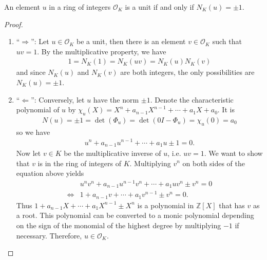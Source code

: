 \begin{thmbox}
    \begin{corollary}
        An element \(u\) in a ring of integers \(\mathcal{O}_K\) is a unit if and only if \(N_K(u) = \pm 1\).
    \end{corollary}
\end{thmbox}
\begin{proof}
    \begin{enumerate}
        \item ``\(\Rightarrow\)'': Let \(u \in \mathcal{O}_K\) be a unit, then there is an element \(v \in \mathcal{O}_K\) such that \(uv = 1\). By the multiplicative property, we have
        \begin{align*}
            1 = N_K(1) = N_K(uv) = N_K(u)N_K(v)
        \end{align*}
        and since \(N_K(u)\) and \(N_K(v)\) are both integers, the only possibilities are \(N_K(u) = \pm 1\).
        \item ``\(\Leftarrow\)'': Conversely, let \(u\) have the norm \(\pm 1\). Denote the characteristic polynomial of \(u\) by \(\chi_u (X) = X^n + a_{n-1} X^{n-1} + \cdots + a_1 X + a_0\). It is
        \begin{align*}
            N(u) = \pm 1 = \det (\Phi_u) = \det(0 I - \Phi_u) = \chi_u (0) = a_0
        \end{align*}
        so we have
        \begin{align*}
            u^n + a_{n-1} u^{n-1} + \cdots + a_1 u \pm 1 = 0 \text{.}
        \end{align*}
        Now let \(v \in K\) be the multiplicative inverse of \(u\), i.e. \(uv = 1\). We want to show that \(v\) is in the ring of integers of \(K\). Multiplying \(v^n\) on both sides of the equation above yields
        \begin{align*}
            & u^n v^n + a_{n-1} u^{n-1} v^n + \cdots + a_1 u v^n \pm v^n = 0 \\
            \iff & 1 + a_{n-1} v + \cdots + a_1 v^{n-1} \pm v^n = 0 \text{.}
        \end{align*}
        Thus \(1 + a_{n-1} X + \cdots + a_1 X^{n-1} \pm X^n\) is a polynomial in \(\mathbb{Z}[X]\) that has \(v\) as a root. This polynomial can be converted to a monic polynomial depending on the sign of the monomial of the highest degree by multiplying \(-1\) if necessary. Therefore, \(u \in \mathcal{O}_K\).
    \end{enumerate}
\end{proof}

